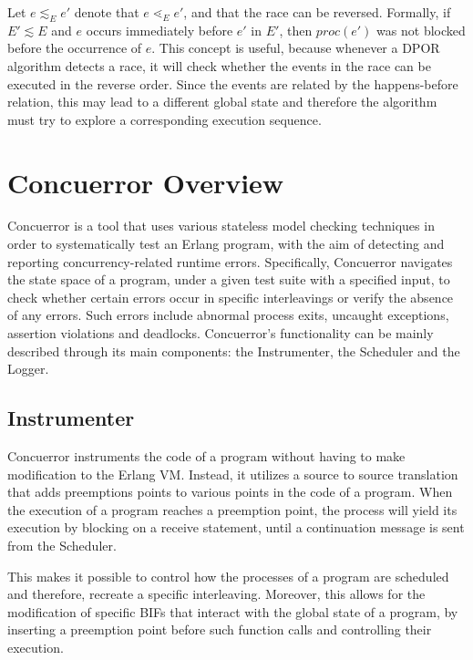 Let $e \lesssim_E e'$ denote
that $e \lessdot_E e'$, and that the race can be reversed. Formally, if $E' \lesssim E$
and $e$ occurs immediately before $e'$ in $E'$, then $proc(e')$ was not
blocked before the occurrence of $e$. This concept is useful, because 
whenever a DPOR algorithm detects a race, it will check
whether the events in the race can be executed in the reverse order.
Since the events are related by the happens-before relation, this may
lead to a different global state and therefore the algorithm must try to
explore a corresponding execution sequence.

\section{Concuerror Overview}

Concuerror \cite{6569727, Gotovos:2011:TDC:2034654.2034664} is a tool that uses various stateless model 
checking techniques in order to systematically 
test an Erlang program, with the aim of detecting and reporting concurrency-related runtime errors.
Specifically, Concuerror navigates the state space of a program, under a given test suite with a specified input,
to check whether certain errors occur in specific interleavings or verify the absence of any errors. Such errors include abnormal process exits, uncaught
exceptions, assertion violations and deadlocks. Concuerror's functionality can be mainly described through its main components:
the Instrumenter, the Scheduler and the Logger. 

\subsection{Instrumenter}

Concuerror instruments the code of a program without having to make modification to the Erlang VM. Instead, it
utilizes a source to source translation that adds preemptions points to various points in the code of a program.
When the execution of a program reaches a preemption point, the process will yield its execution by blocking
on a receive statement, until a continuation message is sent from the Scheduler.

This makes it possible to control how the processes of a program are scheduled and therefore, recreate a specific
interleaving. Moreover, this allows for the modification of specific BIFs that interact with the global
state of a program, by inserting a preemption point before such function calls and controlling their execution.

